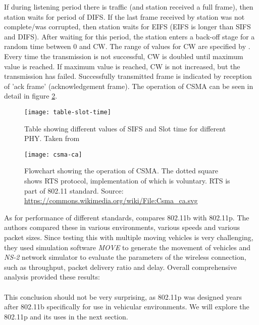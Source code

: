 % 
If during listening period there is traffic (and station received a full frame), then station waits for period of \acrshort{DIFS}. If the last frame received by station was not complete/was corrupted, then station waits for \acrfull{EIFS} (EIFS is longer than \acrshort{SIFS} and \acrshort{DIFS}). After waiting for this period, the station enters a back-off stage for a random time between 0 and \acrfull{CW}. The range of values for \acrshort{CW} are specified by \cite{2016IEEEAccess.}. Every time the transmission is not successful, \acrshort{CW} is doubled until maximum value is reached. If maximum value is reached, \acrshort{CW} is not increased, but the transmission has failed. Successfully transmitted frame is indicated by reception of 'ack frame' (acknowledgement frame). The operation of \acrshort{CSMA} can be seen in detail in figure \ref{fig:csma-ca}.\par
% 
% 
\begin{figure}[h]
    \centering
    \texttt{[image: table-slot-time]}
    \caption{Table showing different values of \acrshort{SIFS} and Slot time for different \acrshort{PHY}. Taken from \cite{Aboul-Magd2008WirelessPerspective}}
    \label{fig:table-st}
\end{figure}
% 
\begin{figure}
    \centering
    \texttt{[image: csma-ca]}
    \caption{Flowchart showing the operation of \acrshort{CSMA}. The dotted square shows \acrshort{RTS} protocol, implementation of which is voluntary. \acrshort{RTS} is part of 802.11 standard. Source: \url{https://commons.wikimedia.org/wiki/File:Csma_ca.svg}}
    \label{fig:csma-ca}
\end{figure}
% 
As for performance of different standards, \cite{Bilgin2013PerformanceAreas} compares 802.11b with 802.11p. The authors compared these in various environments, various speeds and various packet sizes. Since testing this with multiple moving vehicles is very challenging, they used simulation software \emph{MOVE} to generate the movement of vehicles and \emph{NS-2} network simulator to evaluate the parameters of the wireless connection, such as throughput, packet delivery ratio and delay. 
Overall comprehensive analysis provided these results:\\ \\
This conclusion should not be very surprising, as 802.11p was designed years after 802.11b specifically for use in vehicular environments. We will explore the 802.11p and its uses in the next section.